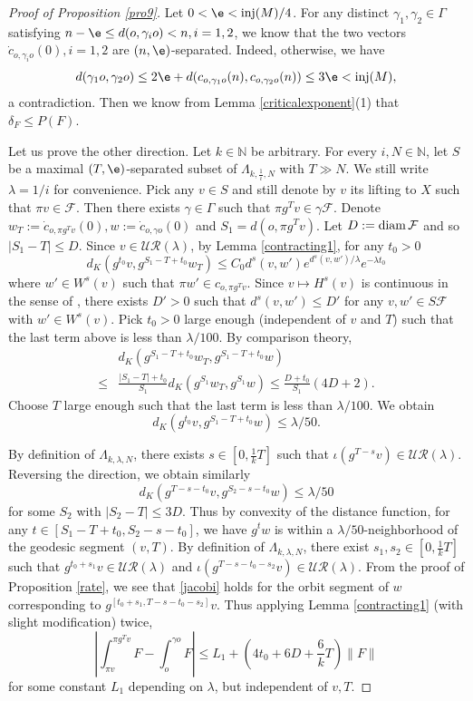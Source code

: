 \documentclass[11pt]{amsart}
\theoremstyle{definition}
\newcommand{\F}{\mathcal{F}}
\newcommand{\UR}{\mathcal{UR}}
\def\NN{{\mathbb N}}
\def\inj{{\text{inj}}}
\def\diam{\mathop{\hbox{{\rm diam}}}}
\def\diam{\mathop{\hbox{{\rm diam}}}}
\def\c{\gamma}   \def\C{\Gamma}
\def\l{\lambda}   \def\L{\Lambda}
\begin{document}
\begin{proof}[Proof of Proposition \ref{pro9}]
Let $0<\e<\text{inj}(M)/4$. For any distinct $\c_1,\c_2\in \C$ satisfying $n-\e\le d(o, \c_io)<n, i=1,2$, we know that the two vectors $\dot c_{o,\c_io}(0), i=1,2$ are $(n,\e)$-separated. Indeed, otherwise, we have 
$$d(\c_1 o, \c_2o)\le 2\e+d( c_{o,\c_1o}(n), c_{o,\c_2o}(n))\le 3\e<\inj(M),$$ 
a contradiction. Then we know from Lemma \ref{criticalexponent}(1) that $\delta_F\le P(F).$

Let us prove the other direction. Let $k\in \NN$ be arbitrary. For every $i,N\in \NN$, let $S$ be a maximal $(T,\e)$-separated subset of $\L_{k,\frac{1}{i},N}$ with $T\gg N$. We still write $\l=1/i$ for convenience. Pick any $v\in S$ and still denote by $v$ its lifting to $X$ such that $\pi v\in \F$. Then there exists $\c\in \Gamma$ such that $\pi g^Tv\in \c \F$. Denote $w_T:=\dot c_{o, \pi g^Tv}(0), w:=\dot c_{o,\c o}(0)$ and $S_1=d(o, \pi g^Tv)$. Let $D:=\diam \F$ and so $|S_1-T|\le D$. Since $v\in \UR(\l)$, by Lemma \ref{contracting1}, for any $t_0>0$
$$d_K(g^{t_0}v, g^{S_1-T+t_0}w_T)\le C_0d^s(v,w')e^{d^s(v,w')/\lambda}e^{-\lambda t_0}$$
where $w'\in W^s(v)$ such that $\pi w'\in c_{o,\pi g^Tv}$. Since $v\mapsto H^s(v)$ is continuous in the sense of \cite[Proposition 6.3]{CKW1}, there exists $D'>0$ such that $d^s(v,w')\le D'$ for any $v, w'\in S\F$ with $w'\in W^s(v)$. Pick $t_0>0$ large enough (independent of $v$ and $T$) such that the last term above is less than $\lambda/100$.
By comparison theory,
\begin{equation*}
\begin{aligned}
&d_K(g^{S_1-T+t_0}w_T,g^{S_1-T+t_0}w)\\
\le &\frac{|S_1-T|+t_0}{S_1}d_K(g^{S_1}w_T,g^{S_1}w)\le \frac{D+t_0}{S_1}(4D+2).
\end{aligned}
\end{equation*}
Choose $T$ large enough such that the last term is less than $\lambda/100$. We obtain
$$d_K(g^{t_0}v, g^{S_1-T+t_0}w)\le \lambda/50.$$

By definition of $\L_{k,\l,N}$, there exists $s\in [0,\frac{1}{k}T]$ such that $\iota(g^{T-s}v)\in \UR(\l)$. Reversing the direction, we obtain similarly
$$d_K(g^{T-s-t_0}v, g^{S_2-s-t_0}w)\le \lambda/50$$
for some $S_2$ with $|S_2-T|\le 3D$. Thus by convexity of the distance function, for any $t\in [S_1-T+t_0,S_2-s-t_0]$, we have $g^tw$ is within a $\lambda/50$-neighborhood of the geodesic segment $(v,T)$.
By definition of $\L_{k,\l,N}$, there exist $s_1,s_2\in [0, \frac{1}{k}T]$ such that $g^{t_0+s_1}v\in \UR(\l)$ and $\iota(g^{T-s-t_0-s_2}v)\in \UR(\l)$.
From the proof of Proposition \ref{rate}, we see that \eqref{jacobi} holds for the orbit segment of $w$ corresponding to $g^{[t_0+s_1, T-s-t_0-s_2]}v$. Thus applying Lemma \ref{contracting1} (with slight modification) twice,
\begin{equation}\label{e:Bowen1}
\left|\int_{\pi v}^{\pi g^Tv}F-\int_{o}^{\c o}F\right|\le L_1+(4t_0+6D+\frac{6}{k}T)\|F\|
\end{equation}
for some constant $L_1$ depending on $\l$, but independent of $v, T$.


\end{proof}
\end{document}
